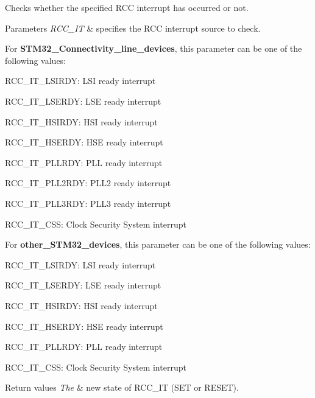 Checks whether the specified R\+CC interrupt has occurred or not. 


\begin{DoxyParams}{Parameters}
{\em R\+C\+C\+\_\+\+IT} & specifies the R\+CC interrupt source to check.\\
\hline
\end{DoxyParams}
For {\bfseries S\+T\+M32\+\_\+\+Connectivity\+\_\+line\+\_\+devices}, this parameter can be one of the following values\+: \begin{DoxyItemize}
\item R\+C\+C\+\_\+\+I\+T\+\_\+\+L\+S\+I\+R\+DY\+: L\+SI ready interrupt \item R\+C\+C\+\_\+\+I\+T\+\_\+\+L\+S\+E\+R\+DY\+: L\+SE ready interrupt \item R\+C\+C\+\_\+\+I\+T\+\_\+\+H\+S\+I\+R\+DY\+: H\+SI ready interrupt \item R\+C\+C\+\_\+\+I\+T\+\_\+\+H\+S\+E\+R\+DY\+: H\+SE ready interrupt \item R\+C\+C\+\_\+\+I\+T\+\_\+\+P\+L\+L\+R\+DY\+: P\+LL ready interrupt \item R\+C\+C\+\_\+\+I\+T\+\_\+\+P\+L\+L2\+R\+DY\+: P\+L\+L2 ready interrupt \item R\+C\+C\+\_\+\+I\+T\+\_\+\+P\+L\+L3\+R\+DY\+: P\+L\+L3 ready interrupt \item R\+C\+C\+\_\+\+I\+T\+\_\+\+C\+SS\+: Clock Security System interrupt\end{DoxyItemize}
For {\bfseries other\+\_\+\+S\+T\+M32\+\_\+devices}, this parameter can be one of the following values\+: \begin{DoxyItemize}
\item R\+C\+C\+\_\+\+I\+T\+\_\+\+L\+S\+I\+R\+DY\+: L\+SI ready interrupt \item R\+C\+C\+\_\+\+I\+T\+\_\+\+L\+S\+E\+R\+DY\+: L\+SE ready interrupt \item R\+C\+C\+\_\+\+I\+T\+\_\+\+H\+S\+I\+R\+DY\+: H\+SI ready interrupt \item R\+C\+C\+\_\+\+I\+T\+\_\+\+H\+S\+E\+R\+DY\+: H\+SE ready interrupt \item R\+C\+C\+\_\+\+I\+T\+\_\+\+P\+L\+L\+R\+DY\+: P\+LL ready interrupt \item R\+C\+C\+\_\+\+I\+T\+\_\+\+C\+SS\+: Clock Security System interrupt\end{DoxyItemize}

\begin{DoxyRetVals}{Return values}
{\em The} & new state of R\+C\+C\+\_\+\+IT (S\+ET or R\+E\+S\+ET). \\
\hline
\end{DoxyRetVals}


